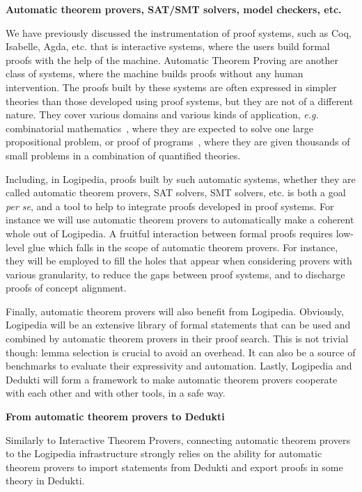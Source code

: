 \bigskip
\noindent
{\bf \Large Automatic theorem provers, SAT/SMT solvers, model checkers, etc.}

\medskip

We have previously discussed the instrumentation of proof systems,
such as Coq, Isabelle, Agda, etc.  that is interactive systems, where
the users build formal proofs with the help of the machine. Automatic
Theorem Proving are another class of systems, where the machine builds
proofs without any human intervention. The proofs built by these
systems are often expressed in simpler theories than those developed
using proof systems, but they are not of a different nature.  They
cover various domains and various kinds of application, {\em e.g.}
combinatorial
mathematics~\cite{DBLP:journals/ai/KonevL15,DBLP:conf/sat/HeuleKM16},
where they are expected to solve one large propositional problem, or
proof of
programs~\cite{DBLP:conf/esop/FilliatreP13,DBLP:journals/pacmpl/ProtzenkoZRRWBD17},
where they are given thousands of small problems in a combination of
quantified theories.

Including, in Logipedia, proofs built by such automatic systems,
whether they are called automatic theorem provers, SAT solvers, SMT
solvers, etc. is both a goal {\em per se}, and a tool to help to
integrate proofs developed in proof systems.  For instance we will use
automatic theorem provers to automatically make a coherent whole out
of Logipedia. A fruitful interaction between formal proofs requires
low-level glue which falls in the scope of automatic theorem provers.
For instance, they will be employed to fill the holes that appear when
considering provers with various granularity, to reduce the gaps
between proof systems, and to discharge proofs of concept alignment.

Finally, automatic theorem provers will also benefit from
Logipedia. Obviously, Logipedia will be an extensive library of formal
statements that can be used and combined by automatic theorem provers
in their proof search. This is not trivial though: lemma selection is
crucial to avoid an overhead. It can also be a source of benchmarks to
evaluate their expressivity and automation.  Lastly, Logipedia and
Dedukti will form a framework to make automatic theorem provers
cooperate with each other and with other tools, in a safe way.

\medskip

\noindent
{\bf \large From automatic theorem provers to Dedukti}

Similarly to Interactive Theorem Provers, connecting automatic theorem provers to the Logipedia
infrastructure strongly relies on the ability for automatic theorem provers to import statements from
Dedukti and export proofs in some theory in Dedukti.

